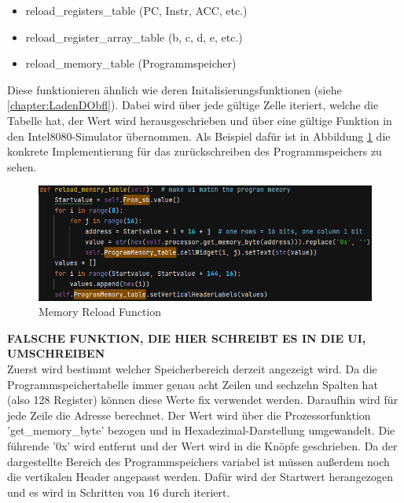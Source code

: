 \documentclass[12pt]{article}
\newcommand{\imgSpaceBefore}{\vspace{10pt}}
\begin{document}
\begin{itemize}
	\item reload\_registers\_table (PC, Instr, ACC, etc.)
	\item reload\_register\_array\_table (b, c, d, e, etc.)
	\item reload\_memory\_table (Programmspeicher)
\end{itemize}

\noindent
Diese funktionieren ähnlich wie deren Initalisierungsfunktionen (siehe \ref{chapter:LadenDObfl}). Dabei wird über jede gültige Zelle iteriert, welche die Tabelle hat, der Wert wird herausgeschrieben und über eine gültige Funktion in den Intel8080-Simulator übernommen. Als Beispiel dafür ist in Abbildung \ref{fig:MemReloadFunc} die konkrete Implementierung für das zurückschreiben des Programmspeichers zu sehen.\imgSpaceBefore

\begin{figure}[H]
\centering
\includegraphics[width=15cm]{bilder/reloadMemFunc}
\caption{Memory Reload Function}
\label{fig:MemReloadFunc}
\end{figure}

\noindent
\textbf{FALSCHE FUNKTION, DIE HIER SCHREIBT ES IN DIE UI, UMSCHREIBEN}\\
Zuerst wird bestimmt welcher Speicherbereich derzeit angezeigt wird. Da die Programmspeichertabelle immer genau acht Zeilen und sechzehn Spalten hat (also 128 Register) können diese Werte fix verwendet werden. Daraufhin wird für jede Zeile die Adresse berechnet. Der Wert wird über die Prozessorfunktion 'get\_memory\_byte' bezogen und in Hexadezimal-Darstellung umgewandelt. Die führende '0x' wird entfernt und der Wert wird in die Knöpfe geschrieben. Da der dargestellte Bereich des Programmspeichers variabel ist müssen außerdem noch die vertikalen Header angepasst werden. Dafür wird der Startwert herangezogen und es wird in Schritten von 16 durch iteriert. 

\newpage
\end{document}

